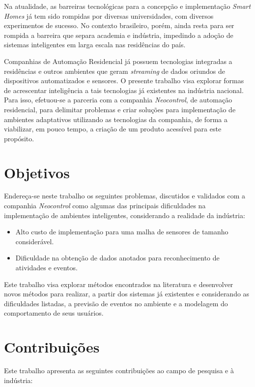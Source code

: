 \documentclass[
	12pt,				%
	openright,			%
	twoside,			%
	a4paper,			%
	english,			%
	spanish,			%
	brazil,				%
	]{abntex2}\usepackage[]{graphicx}\usepackage[]{color}
\begin{document}
Na atualidade, as barreiras tecnológicas para a concepção e implementação \textit{Smart Homes} já tem sido rompidas por diversas universidades, com diversos experimentos de sucesso. No contexto brasileiro, porém, ainda resta para ser rompida a barreira que separa academia e indústria, impedindo a adoção de sistemas inteligentes em larga escala nas residências do país.

Companhias de Automação Residencial já possuem tecnologias integradas a residências e outros ambientes que geram \textit{streaming} de dados oriundos de dispositivos automatizados e sensores. O presente trabalho visa explorar formas de acrescentar inteligência a tais tecnologias já existentes na indústria nacional. Para isso, efetuou-se a parceria com a companhia \textit{Neocontrol}, de automação residencial, para delimitar problemas e criar soluções para implementação de ambientes adaptativos utilizando as tecnologias da companhia, de forma a viabilizar, em pouco tempo, a criação de um produto acessível para este propósito.

\section{Objetivos}

Endereça-se neste trabalho os seguintes problemas, discutidos e validados com a companhia \textit{Neocontrol} como algumas das principais dificuldades na implementação de ambientes inteligentes, considerando a realidade da indústria:

\begin{itemize}
	\item Alto custo de implementação para uma malha de sensores de tamanho considerável.
	\item Dificuldade na obtenção de dados anotados para reconhecimento de atividades e eventos.
\end{itemize}

Este trabalho visa explorar métodos encontrados na literatura e desenvolver novos métodos para realizar, a partir dos sistemas já existentes e considerando as dificuldades listadas, a previsão de eventos no ambiente e a modelagem do comportamento de seus usuários.

\section{Contribuições}

Este trabalho apresenta as seguintes contribuições ao campo de pesquisa e à indústria:
\end{document}
